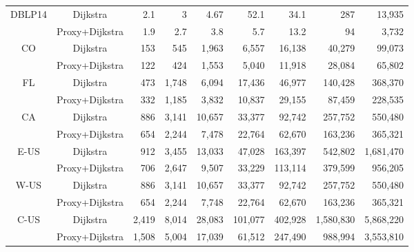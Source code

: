 \begin{table}[t!]
\begin{center}
\begin{tabular}{|c|c||r|r|r|r|r|r|r|}
\multirow{2}{*}{DBLP14} & Dijkstra & 2.1 & 3 & 4.67 & 52.1 & 34.1 & 287 & 13,935 \\ \cline{2-9}
                      & Proxy+Dijkstra & 1.9 & 2.7 & 3.8 & 5.7 & 13.2 & 94 & 3,732 \\ \hline
\multirow{2}{*}{CO}  & Dijkstra & 153 & 545 & 1,963 & 6,557 & 16,138 & 40,279 & 99,073 \\ \cline{2-9}
                  & Proxy+Dijkstra  & 122 & 424 & 1,553 & 5,040 & 11,918 & 28,084 & 65,802 \\ \hline
\multirow{2}{*}{FL}  & Dijkstra & 473 & 1,748 & 6,094 & 17,436 & 46,977 & 140,428 & 368,370 \\ \cline{2-9}
                   & Proxy+Dijkstra & 332 & 1,185 & 3,832 & 10,837 & 29,155 & 87,459 & 228,535 \\ \hline
\multirow{2}{*}{CA}  & Dijkstra & 886 & 3,141 & 10,657 & 33,377 & 92,742 & 257,752 & 550,480 \\ \cline{2-9}
                   & Proxy+Dijkstra & 654 & 2,244 & 7,478 & 22,764 & 62,670 & 163,236 & 365,321 \\ \hline
\multirow{2}{*}{E-US} & Dijkstra&912 & 3,455 & 13,033 & 47,028 & 163,397 & 542,802 & 1,681,470 \\ \cline{2-9}
                   & Proxy+Dijkstra & 706 & 2,647 & 9,507 & 33,229 & 113,114 & 379,599 & 956,205 \\ \hline
\multirow{2}{*}{W-US} & Dijkstra & 886 & 3,141 & 10,657 & 33,377 & 92,742 & 257,752 & 550,480 \\ \cline{2-9}
                   & Proxy+Dijkstra & 654 & 2,244 & 7,748 & 22,764 & 62,670 & 163,236 & 365,321 \\ \hline
\multirow{2}{*}{C-US} & Dijkstra & 2,419 & 8,014 & 28,083 & 101,077 & 402,928 & 1,580,830 & 5,868,220 \\ \cline{2-9}
                   & Proxy+Dijkstra & 1,508 & 5,004 & 17,039 & 61,512 & 247,490 & 988,994 & 3,553,810 \\ \hline
\end{tabular}
\end{center}
\end{table}

